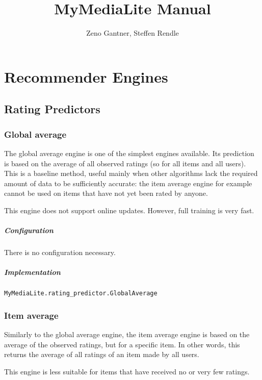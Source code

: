 \documentclass[]{report}
\title{MyMediaLite Manual}
\author{Zeno Gantner, Steffen Rendle}
\begin{document}
\maketitle

\tableofcontents

\chapter{Recommender Engines}

\section{Rating Predictors}

\subsection{Global average}
The global average engine is one of the simplest engines
available. Its prediction is based on the average of all observed
ratings (so for all items and all users). This is a baseline
method, useful mainly when other algorithms lack the required
amount of data to be sufficiently accurate: the item average engine
for example cannot be used on items that have not yet been rated by
anyone.

This engine does not support online updates. However, full training is
very fast.

\paragraph[Configuration]{Configuration}
There is no configuration necessary.

\paragraph[Implementation]{Implementation}
\texttt{MyMediaLite.rating\_predictor.GlobalAverage}

\subsection[Item average]{Item average}
Similarly to the global average engine, the item average engine is
based on the average of the observed ratings, but for a specific item.
In other words, this returns the average of all ratings of an item made
by all users.

This engine is less suitable for items that have received no or very
few ratings.
\end{document}
